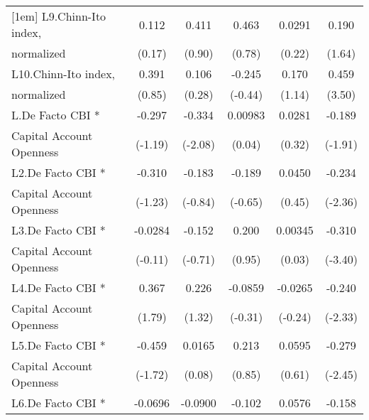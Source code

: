 {\begin{tabular}{l*{5}{c}}
[1em]
L9.Chinn-Ito index, &       0.112         &       0.411         &       0.463         &      0.0291         &       0.190         \\
normalized          &      (0.17)         &      (0.90)         &      (0.78)         &      (0.22)         &      (1.64)         \\
[1em]
L10.Chinn-Ito index,&       0.391         &       0.106         &      -0.245         &       0.170         &       0.459\sym{***}\\
normalized          &      (0.85)         &      (0.28)         &     (-0.44)         &      (1.14)         &      (3.50)         \\
[1em]
L.De Facto CBI *    &      -0.297         &      -0.334\sym{*}  &     0.00983         &      0.0281         &      -0.189         \\
Capital Account Openness&     (-1.19)         &     (-2.08)         &      (0.04)         &      (0.32)         &     (-1.91)         \\
[1em]
L2.De Facto CBI *   &      -0.310         &      -0.183         &      -0.189         &      0.0450         &      -0.234\sym{*}  \\
Capital Account Openness&     (-1.23)         &     (-0.84)         &     (-0.65)         &      (0.45)         &     (-2.36)         \\
[1em]
L3.De Facto CBI *   &     -0.0284         &      -0.152         &       0.200         &     0.00345         &      -0.310\sym{***}\\
Capital Account Openness&     (-0.11)         &     (-0.71)         &      (0.95)         &      (0.03)         &     (-3.40)         \\
[1em]
L4.De Facto CBI *   &       0.367         &       0.226         &     -0.0859         &     -0.0265         &      -0.240\sym{*}  \\
Capital Account Openness&      (1.79)         &      (1.32)         &     (-0.31)         &     (-0.24)         &     (-2.33)         \\
[1em]
L5.De Facto CBI *   &      -0.459         &      0.0165         &       0.213         &      0.0595         &      -0.279\sym{*}  \\
Capital Account Openness&     (-1.72)         &      (0.08)         &      (0.85)         &      (0.61)         &     (-2.45)         \\
[1em]
L6.De Facto CBI *   &     -0.0696         &     -0.0900         &      -0.102         &      0.0576         &      -0.158         \\

\end{tabular}}
